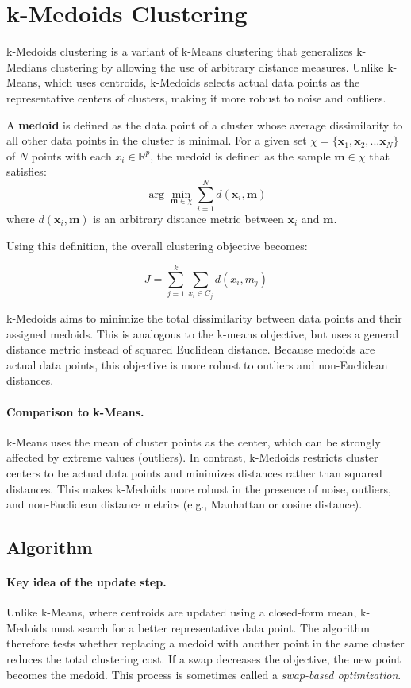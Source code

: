 \documentclass{article}
\begin{document}
\section{k-Medoids Clustering}

k-Medoids clustering is a variant of k-Means clustering that generalizes k-Medians clustering by allowing the use of arbitrary distance measures. Unlike k-Means, which uses centroids, k-Medoids selects actual data points as the representative centers of clusters, making it more robust to noise and outliers.

A \textbf{medoid} is defined as the data point of a cluster whose average dissimilarity to all other data points in the cluster is minimal. For a given set $\chi = \{\mathbf{x}_1, \mathbf{x}_2, ...\mathbf{x}_N\}$ of $N$ points with each $x_i \in \mathbb{R}^p$, the medoid is defined as the sample $\mathbf{m} \in \chi$ that satisfies:
\[
\arg \min_{\mathbf{m} \in \chi} \sum_{i=1}^N d(\mathbf{x}_i, \mathbf{m})
\]
where $d(\mathbf{x}_i, \mathbf{m})$ is an arbitrary distance metric between $\mathbf{x}_i$ and $\mathbf{m}$.


Using this definition, the overall clustering objective becomes:

\[
J = \sum_{j=1}^k \sum_{x_i \in C_j} d(x_i, m_j)
\]

k-Medoids aims to minimize the total dissimilarity between data points and their assigned medoids. This is analogous to the k-means objective, but uses a general distance metric
instead of squared Euclidean distance. Because medoids are actual data points,
this objective is more robust to outliers and non-Euclidean distances.


\paragraph{Comparison to k-Means.}
k-Means uses the mean of cluster points as the center, which can be strongly
affected by extreme values (outliers). In contrast, k-Medoids restricts cluster
centers to be actual data points and minimizes distances rather than squared
distances. This makes k-Medoids more robust in the presence of noise, outliers,
and non-Euclidean distance metrics (e.g., Manhattan or cosine distance).


\subsection{Algorithm}

\paragraph{Key idea of the update step.}
Unlike k-Means, where centroids are updated using a closed-form mean,
k-Medoids must search for a better representative data point.
The algorithm therefore tests whether replacing a medoid with another
point in the same cluster reduces the total clustering cost.
If a swap decreases the objective, the new point becomes the medoid.
This process is sometimes called a \textit{swap-based optimization}.
\end{document}
